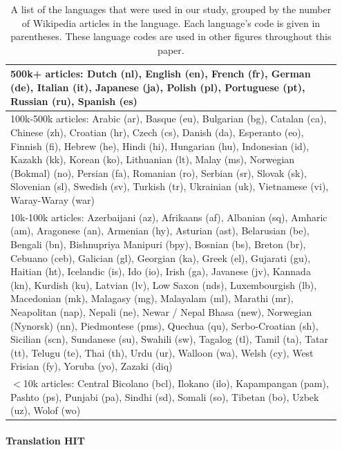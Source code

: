 \documentclass[11pt]{article}
\begin{document}
\begin{table}[h]
\scriptsize 
\begin{center}
\begin{tabular}{|p{0.95\linewidth}|}
\hline
{\sc 500k+ articles:}
Dutch (nl), English (en), French (fr), German (de), Italian (it), Japanese (ja), Polish (pl), Portuguese (pt), Russian (ru), Spanish (es)\\
\hline
{\sc 100k-500k articles:} Arabic (ar), Basque (eu), Bulgarian (bg), Catalan (ca), Chinese (zh), Croatian (hr), Czech (cs), Danish (da), Esperanto (eo), Finnish (fi), Hebrew (he), Hindi (hi), Hungarian (hu), Indonesian (id), Kazakh (kk), Korean (ko), Lithuanian (lt), Malay (ms), Norwegian (Bokmal) (no), Persian (fa), Romanian (ro), Serbian (sr), Slovak (sk), Slovenian (sl), Swedish (sv), Turkish (tr), Ukrainian (uk), Vietnamese (vi), Waray-Waray (war)\\
\hline
{\sc 10k-100k articles:}
Azerbaijani (az), Afrikaans (af), Albanian (sq), Amharic (am), Aragonese (an), Armenian (hy), Asturian (ast), Belarusian (be), Bengali (bn), Bishnupriya Manipuri (bpy), Bosnian (bs), Breton (br), Cebuano (ceb), Galician (gl), Georgian (ka), Greek (el), Gujarati (gu), Haitian (ht), Icelandic (is), Ido (io), Irish (ga), Javanese (jv), Kannada (kn), Kurdish (ku), Latvian (lv), Low Saxon (nds), Luxembourgish (lb), Macedonian (mk), Malagasy (mg), Malayalam (ml), Marathi (mr), Neapolitan (nap), Nepali (ne), Newar / Nepal Bhasa (new), Norwegian (Nynorsk) (nn), Piedmontese (pms), Quechua (qu), Serbo-Croatian (sh), Sicilian (scn), Sundanese (su), Swahili (sw), Tagalog (tl), Tamil (ta), Tatar (tt), Telugu (te), Thai (th), Urdu (ur), Walloon (wa), Welsh (cy), West Frisian (fy), Yoruba (yo), Zazaki (diq)\\
\hline
{\sc $<$10k articles:} Central Bicolano (bcl), Ilokano (ilo), Kapampangan (pam), Pashto (ps), Punjabi (pa), Sindhi (sd), Somali (so), Tibetan (bo), Uzbek (uz), Wolof (wo)\\
\hline
\end{tabular}
\end{center}
\normalsize
\caption{A list of the languages that were used in our study, grouped by the number of Wikipedia articles in the language.  Each language's code is given in parentheses.  These language codes are used in other figures throughout this paper.}\label{wikipedia-buckets}
\end{table}%

\paragraph{Translation HIT}
\end{document}
